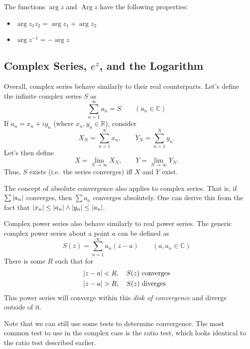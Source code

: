 \documentclass[10pt]{scrartcl}
\numberwithin{equation}{subsection}
\theoremstyle{definition}
\theoremstyle{remark}
\newcommand{\Reals}{\mathbb{R}}
\newcommand{\Complex}{\mathbb{C}}
\newcommand{\inv}[1]{
	{#1}^{-1}
}
\DeclareMathOperator{\Arg}{Arg}
\begin{document}
The functions $\arg{z}$ and $\Arg{z}$ have the following properties:
\begin{itemize}
\item $\arg{z_1 z_2} = \arg{z_1} + \arg{z_2}$
\item $\arg{\inv{z}} = - \arg{z}$
\end{itemize}
\subsection{Complex Series, $e^z$, and the Logarithm}
Overall, complex series behave similarly to their real counterparts.
Let's define the infinite complex series $S$ as 
\begin{equation}
\sum_{n=1}^{\infty} a_n = S \qquad (a_n \in \Complex)
\end{equation}
If $a_n = x_n + i y_n$ (where $x_n, y_n \in \Reals$), consider
\[
X_N = \sum_{n=1}^{N} x_n, \qquad Y_N = \sum_{n=1}^{N} y_n.
\]
Let's then define
\[
X = \lim_{N \to \infty} X_N, \qquad Y = \lim_{N \to \infty} Y_N.
\]
Thus, $S$ exists (i.e.\ the series converges) iff $X$ and $Y$ exist.

The concept of absolute convergence also applies to complex series.
That is, if $\sum \abs{a_n}$ converges, then $ \sum a_n$ converges absolutely. 
One can derive this from the fact that $\abs{x_n} \leq \abs{a_n} \wedge
\abs{y_n} \leq \abs{a_n}$.

Complex power series also behave similarly to real power series. The generic
complex power series about a point $a$ can be defined as
\begin{equation}
S(z) = \sum_{n=1}^{\infty} a_n (z - a) \qquad (a, a_n \in \Complex)
\end{equation}
There is some $R$ such that for
\begin{align*}
\abs{z-a} &< R, \quad S(z)~\text{converges} \\
\abs{z-a} &> R, \quad S(z)~\text{diverges} \\
\end{align*}
This power series will converge within this \textit{disk of convergence} and
diverge outside of it.

Note that we can still use some tests to determine convergence. The most common
test to use in the complex case is the ratio test, which looks identical to the
ratio test described earlier.
\end{document}
